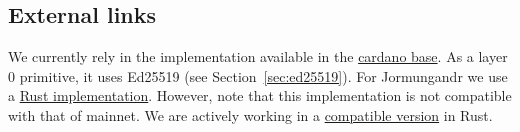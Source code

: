 \subsection{External links}
We currently rely in the implementation available in the \href{https://github
.com/input-output-hk/cardano-base/tree/master/cardano-crypto-class/src/Cardano/Crypto/KES}{cardano base}. As a layer
0 primitive, it uses Ed25519 (see Section~\ref{sec:ed25519}). For Jormungandr we use a \href{https://github
.com/input-output-hk/chain-libs/tree/master/chain-crypto/src/algorithms/sumed25519}{Rust implementation}. However,
note that this implementation is not compatible with that of mainnet. We are actively working in a
\href{https://github.com/input-output-hk/kes-mmm-sumed25519/tree/crate_review}{compatible version} in Rust.

